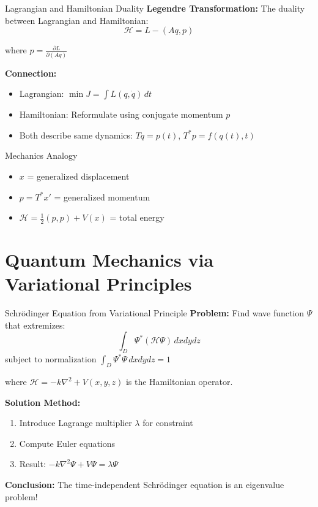 \documentclass[aspectratio=169,10pt]{beamer}
\begin{document}
\begin{frame}{Lagrangian and Hamiltonian Duality}
  \textbf{Legendre Transformation:} The duality between Lagrangian and Hamiltonian:
  \[
    \mathcal{H} = L - (Aq, p)
  \]

  where $p = \frac{\partial L}{\partial(Aq)}$

  \vspace{0.3cm}
  \textbf{Connection:}
  \begin{itemize}
    \item Lagrangian: $\min J = \int L(q, \dot{q}) \, dt$
    \item Hamiltonian: Reformulate using conjugate momentum $p$
    \item Both describe same dynamics: $Tq = p(t)$, $T^*p = f(q(t),t)$
  \end{itemize}

  \vspace{0.3cm}
  \begin{block}{Mechanics Analogy}
    \begin{itemize}
      \item $x$ = generalized displacement
      \item $p = T^*x'$ = generalized momentum
      \item $\mathcal{H} = \frac{1}{2}(p,p) + V(x)$ = total energy
    \end{itemize}
  \end{block}
\end{frame}

\section{Quantum Mechanics via Variational Principles}

\begin{frame}{Schrödinger Equation from Variational Principle}
  \textbf{Problem:} Find wave function $\Psi$ that extremizes:
  \[
    \int_D \Psi^*(\mathcal{H}\Psi) \, dxdydz
  \]
  subject to normalization $\int_D \Psi^*\Psi \, dxdydz = 1$

  \vspace{0.3cm}
  where $\mathcal{H} = -k\nabla^2 + V(x,y,z)$ is the Hamiltonian operator.

  \vspace{0.3cm}
  \textbf{Solution Method:}
  \begin{enumerate}
    \item Introduce Lagrange multiplier $\lambda$ for constraint
    \item Compute Euler equations
    \item Result: $-k\nabla^2\Psi + V\Psi = \lambda\Psi$
  \end{enumerate}

  \vspace{0.3cm}
  \textbf{Conclusion:} The time-independent Schrödinger equation is an eigenvalue problem!
\end{frame}
\end{document}
